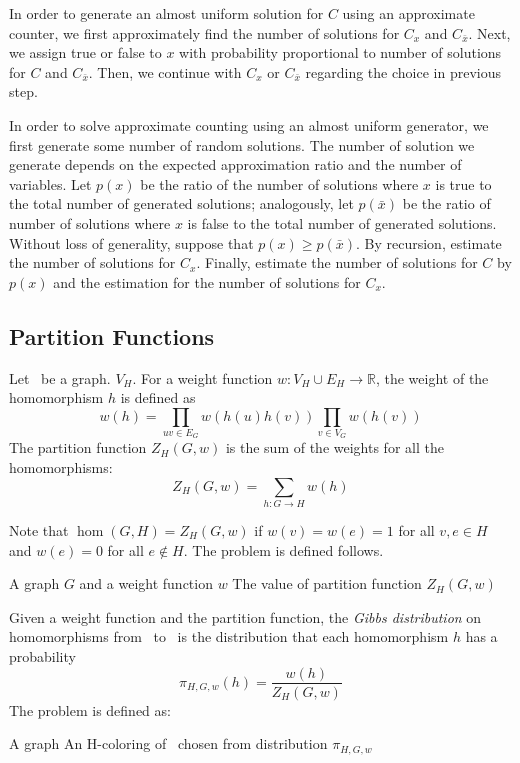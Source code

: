 In order to generate an almost uniform solution for \(C\) using an approximate counter,
we first approximately find the number of solutions for \(C_x\) and \(C_{\bar x}\)\@.
Next, we assign true or false to \(x\) with probability proportional to number of solutions 
for \(C\) and \(C_{\bar x}\)\@. Then, we continue
with \(C_x\) or \(C_{\bar x}\) regarding the choice in previous step.

In order to solve approximate counting using an almost uniform generator, we first
generate some number of random solutions. The number of solution we generate depends 
on the expected approximation ratio and the number of variables.
Let \(p(x)\) be the ratio of the number of solutions
where \(x\) is true to the total number of generated solutions; analogously, let \(p(\bar x)\) be
the ratio of number of solutions where \(x\) is false to the total number of generated solutions.
Without loss of generality, suppose that \(p(x) \ge p(\bar x)\)\@.
By recursion, estimate the number of solutions for \(C_x\). Finally, estimate 
the number of solutions for \(C\) by \(p(x)\) and the estimation for the 
number of solutions for \(C_x\)\@.

\subsection*{Partition Functions}
Let \mH\ be a graph.%
\(V_H\). For a weight function \(w: V_H \cup E_H\to \mathbb{R}\), the weight of the homomorphism 
\(h\) is defined as
\[w(h)=\prod_{uv\in E_G}w(h(u)h(v))\prod_{v\in V_G}w(h(v))\]
The partition function \(Z_H(G,w)\) is the sum of the weights for all the homomorphisms:
\[Z_H(G,w)=\sum_{h:G\to H}w(h)\]

Note that \(\hom(G,H)=Z_{H}(G,w)\) if \(w(v)=w(e)=1\) for all \(v,e\in H\)
and \(w(e)=0\) for all \(e\not\in H\)\@. 
The problem  is defined follows.

\pnndef%
{A graph \(G\) and a weight function \(w\)}
{The value of partition function \(Z_H(G,w)\)}


Given a weight function and the partition function, 
the \emph{Gibbs distribution} on homomorphisms from \mG\ to \mH\ is
the distribution that each homomorphism \(h\) has a probability 
\[\pi_{H,G,w}(h)=\frac{w(h)}{Z_H(G,w)}\]
The problem  is defined as:

\pnndef%
{A graph \mG}
{An H-coloring of \mG\ chosen from distribution \(\pi_{H,G,w}\)}

